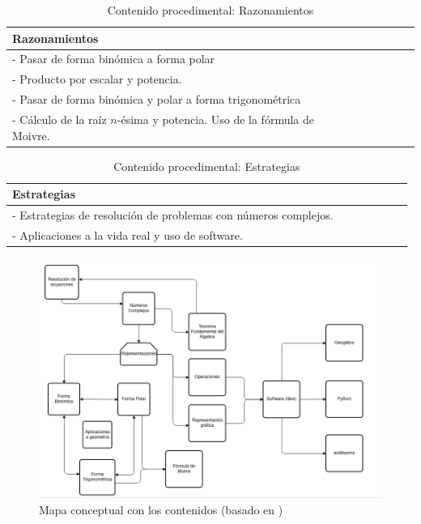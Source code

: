 \documentclass[../main.tex]{memoir}
\begin{document}
\begin{table}[H]
	\centering
	\begin{tabular}{lcccccc}
		\toprule
		\hspace{5cm}Razonamientos \\
		\midrule
		- Pasar de forma binómica a forma polar \\
		- Producto por escalar y potencia. \\
		- Pasar de forma binómica y polar a forma trigonométrica\\
		- Cálculo de la raíz $n$-ésima y potencia. Uso de la fórmula de Moivre.\\
		\bottomrule
	\end{tabular}
	\caption{Contenido procedimental: Razonamientos}
	\label{tab:razonamientos}
\end{table}


\begin{table}[H]
	\centering
	\begin{tabular}{lcccccc}
		\toprule
		\hspace{5cm}Estrategias \\
		\midrule
		- Estrategias de resolución de problemas con números complejos. \\ - Aplicaciones a la vida real y uso de software. \\
		\bottomrule
	\end{tabular}
	\caption{Contenido procedimental: Estrategias}
	\label{tab:estrategias}
\end{table}


\begin{figure}[H]
	\centering
	\includegraphics[scale=0.4]{images/mapa-conceptual.png}
	\caption{Mapa conceptual con los contenidos (basado en \cite{trigonometria})}
	\label{mapa-conceptual}
\end{figure}
\end{document}
